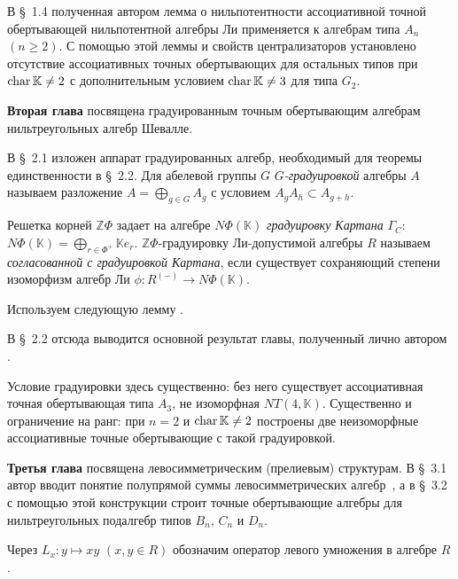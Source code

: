 В \S~1.4 полученная автором лемма о нильпотентности ассоциативной точной
обертывающей нильпотентной алгебры Ли \cite[лемма~2.7]{jsfu2026} применяется к
алгебрам типа $A_n$ $(n\geq2)$. С помощью этой леммы и свойств централизаторов
установлено отсутствие ассоциативных точных обертывающих для остальных типов
при $\operatorname{char}\mathbb{K}\neq2$ с дополнительным условием $\operatorname{char}\mathbb{K}\neq3$ для
типа $G_2$.

\textbf{Вторая глава} посвящена градуированным точным обертывающим алгебрам
нильтреугольных алгебр Шевалле.

В \S~2.1 изложен аппарат градуированных алгебр, необходимый для теоремы
единственности в \S~2.2. Для абелевой группы $G$ \emph{$G$-градуировкой}
алгебры $A$ называем разложение $A=\bigoplus_{g\in G}A_g$ с условием
$A_gA_h\subset A_{g+h}$.

Решетка корней $\mathbb{Z}\Phi$ задает на алгебре $N\Phi(\mathbb{K})$
\emph{градуировку Картана} $\Gamma_C$:
$N\Phi(\mathbb{K})=\bigoplus_{r\in\Phi^+}\mathbb{K}e_r$.
$\mathbb{Z}\Phi$-градуировку Ли-допустимой алгебры $R$ называем
\emph{согласованной с градуировкой Картана}, если существует сохраняющий
степени изоморфизм алгебр Ли $\phi\colon R^{(-)}\to N\Phi(\mathbb{K})$.

Используем следующую лемму \cite[лемма~2.1]{jsfu2026}.


В \S~2.2 отсюда выводится основной результат главы, полученный лично автором
\cite[теорема~2]{jsfu2026}.


Условие градуировки здесь существенно: без него существует ассоциативная точная
обертывающая типа $A_3$, не изоморфная $NT(4,\mathbb{K})$. Существенно и
ограничение на ранг: при $n=2$ и $\operatorname{char}\mathbb{K}\neq2$ построены две
неизоморфные ассоциативные точные обертывающие с такой градуировкой.

\medskip

\textbf{Третья глава} посвящена левосимметрическим (прелиевым) структурам.
В \S~3.1 автор вводит понятие полупрямой суммы левосимметрических
алгебр~\cite[определение~3]{jsfu2026}, а в \S~3.2 с помощью этой конструкции строит
точные обертывающие алгебры для нильтреугольных подалгебр типов $B_n$, $C_n$ и
$D_n$.

Через $L_x\colon y\mapsto xy$ $(x,y\in R)$ обозначим оператор левого умножения
в алгебре $R$.


